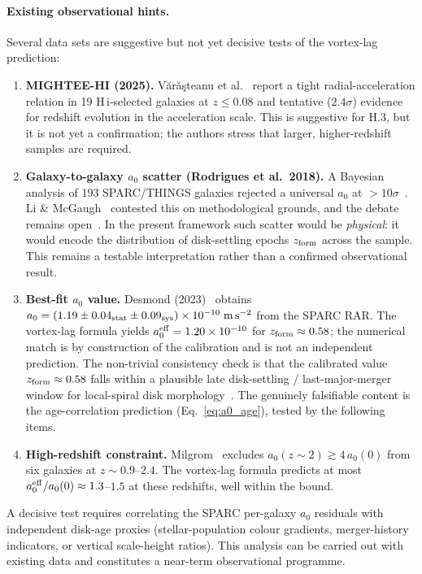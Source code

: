 \documentclass[11pt]{article}
\begin{document}
\paragraph{Existing observational hints.}
Several data sets are suggestive but not yet decisive tests of the
vortex-lag prediction:
\begin{enumerate}
\item \textbf{MIGHTEE-HI (2025).}
  V{\u a}r{\u a}{\c s}teanu et al.~\cite{MIGHTEE2025} report a
  tight radial-acceleration relation in 19 H\,{\sc i}-selected
  galaxies at $z\leq0.08$ and tentative ($2.4\sigma$) evidence for
  redshift evolution in the acceleration scale.  This is suggestive
  for H.3, but it is not yet a confirmation; the authors stress that
  larger, higher-redshift samples are required.
\item \textbf{Galaxy-to-galaxy $a_0$ scatter (Rodrigues et al.\ 2018).}
  A Bayesian analysis of 193 SPARC/THINGS galaxies rejected
  a universal $a_0$ at $>10\sigma$~\cite{Rodrigues2018}.
  Li \& McGaugh~\cite{LiMcGaugh2018} contested this on
  methodological grounds, and the debate
  remains open~\cite{Desmond2021cautionary}.
  In the present framework such scatter would be \emph{physical}:
  it would encode the distribution of disk-settling epochs
  $z_{\rm form}$ across the sample.  This remains a testable
  interpretation rather than a confirmed observational result.
\item \textbf{Best-fit $a_0$ value.}
  Desmond (2023)~\cite{Desmond2023} obtains
  $a_0=(1.19\pm0.04_{\rm stat}\pm0.09_{\rm sys})\times
  10^{-10}\;\mathrm{m\,s^{-2}}$ from the SPARC RAR.  The
  vortex-lag formula yields $a_0^{\rm eff}=1.20\times10^{-10}$
  for $z_{\rm form}\approx 0.58$; the numerical match is
  by construction of the calibration and is not an
  independent prediction.  The non-trivial consistency
  check is that the calibrated value $z_{\rm form}\approx
  0.58$ falls within a plausible late disk-settling /
  last-major-merger window for local-spiral disk
  morphology~\cite{Hopkins2010,Stewart2008}.  The genuinely
  falsifiable content is the age-correlation prediction
  (Eq.~\eqref{eq:a0_age}), tested by the following items.
\item \textbf{High-redshift constraint.}
  Milgrom~\cite{Milgrom2017highz} excludes
  $a_0(z\!\sim\!2)\gtrsim 4\,a_0(0)$ from six galaxies at
  $z\sim0.9$--$2.4$.  The vortex-lag formula predicts at most
  $a_0^{\rm eff}/a_0(0)\approx 1.3$--$1.5$ at these redshifts,
  well within the bound.
\end{enumerate}
\noindent A decisive test requires correlating the SPARC
per-galaxy $a_0$ residuals with independent disk-age proxies
(stellar-population colour gradients, merger-history indicators, or
vertical scale-height ratios).  This analysis can be carried out
with existing data and constitutes a near-term observational
programme.
\end{document}
